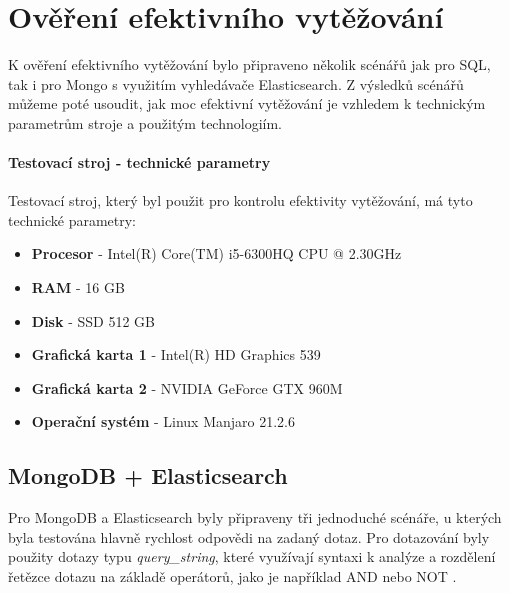 \lstset{style=sqlstyle}

\chapter{Ověření efektivního vytěžování}
K ověření efektivního vytěžování bylo připraveno několik scénářů jak pro SQL, tak i pro Mongo s využitím vyhledávače Elasticsearch. Z výsledků scénářů můžeme poté usoudit, jak moc efektivní vytěžování je vzhledem k technickým parametrům stroje a použitým technologiím.

\subsubsection{Testovací stroj - technické parametry}
Testovací stroj, který byl použit pro kontrolu efektivity vytěžování, má tyto technické parametry:
\begin{itemize}
\item \textbf{Procesor} - Intel(R) Core(TM) i5-6300HQ CPU @ 2.30GHz
\item \textbf{RAM} - 16 GB
\item \textbf{Disk} - SSD 512 GB
\item \textbf{Grafická karta 1} - Intel(R) HD Graphics 539
\item \textbf{Grafická karta 2} - NVIDIA GeForce GTX 960M
\item \textbf{Operační systém} - Linux Manjaro 21.2.6

\end{itemize}

\section{MongoDB + Elasticsearch}
Pro MongoDB a Elasticsearch byly připraveny tři jednoduché scénáře, u kterých byla testována hlavně rychlost odpovědi na zadaný dotaz. Pro dotazování byly použity dotazy typu \textit{query\_string}, které využívají syntaxi k analýze a rozdělení řetězce dotazu na základě operátorů, jako je například AND nebo NOT \cite{elastic_query}.

\newpage
